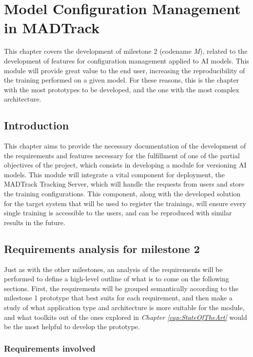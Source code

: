 \chapter{Model Configuration Management in MADTrack}\label{cap:Milestone2}

This chapter covers the development of milestone 2 (codename \emph{M}), related to the development of features for configuration
management applied to \acrshort{AI} models. This module will provide great value to the end user, increasing the reproducibility of the
training performed on a given model. For these reasons, this is the chapter with the most prototypes to be developed, and the one with 
the most complex architecture.

\section{Introduction}

This chapter aims to provide the necessary documentation of the development of the requirements and features necessary for the fulfillment
of one of the partial objectives of the project, which consists in developing a module for versioning \acrshort{AI} models. This module will
integrate a vital component for deployment, the MADTrack Tracking Server, which will handle the requests from users and store the training 
configurations. This component, along with the developed solution for the target system that will be used to register the trainings, will ensure
every single training is accessible to the users, and can be reproduced with similar results in the future.

\section{Requirements analysis for milestone 2}

Just as with the other milestones, an analysis of the requirements will be performed to define a high-level outline of what is to come on the 
following sections. First, the requirements will be grouped semantically according to the milestone 1 prototype that best suits for each requirement,
and then make a study of what application type and architecture is more suitable for the module, and what toolkits out of the ones explored in 
\emph{Chapter \ref{cap:StateOfTheArt}} would be the most helpful to develop the prototype.

\subsection{Requirements involved}

